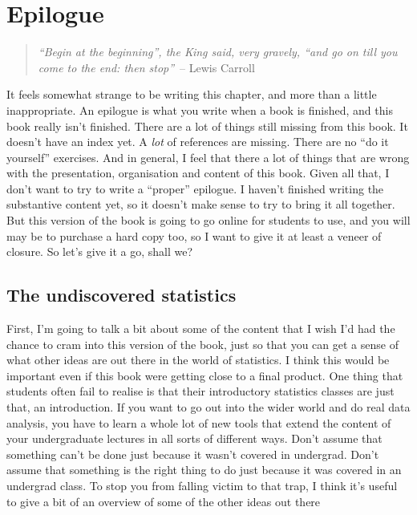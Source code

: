 \documentclass[
  a4paper,
]{book}
\begin{document}

\hypertarget{epilogue}{%
\chapter*{Epilogue}\label{epilogue}}


\begin{quote}
\emph{``Begin at the beginning'', the King said, very gravely, ``and go
on till you come to the end: then stop''}~-- Lewis Carroll
\end{quote}

It feels somewhat strange to be writing this chapter, and more than a
little inappropriate. An epilogue is what you write when a book is
finished, and this book really isn't finished. There are a lot of things
still missing from this book. It doesn't have an index yet. A \emph{lot}
of references are missing. There are no ``do it yourself'' exercises.
And in general, I feel that there a lot of things that are wrong with
the presentation, organisation and content of this book. Given all that,
I don't want to try to write a ``proper'' epilogue. I haven't finished
writing the substantive content yet, so it doesn't make sense to try to
bring it all together. But this version of the book is going to go
online for students to use, and you will may be to purchase a hard copy
too, so I want to give it at least a veneer of closure. So let's give it
a go, shall we?

\hypertarget{the-undiscovered-statistics}{%
\section*{The undiscovered
statistics}\label{the-undiscovered-statistics}}


First, I'm going to talk a bit about some of the content that I wish I'd
had the chance to cram into this version of the book, just so that you
can get a sense of what other ideas are out there in the world of
statistics. I think this would be important even if this book were
getting close to a final product. One thing that students often fail to
realise is that their introductory statistics classes are just that, an
introduction. If you want to go out into the wider world and do real
data analysis, you have to learn a whole lot of new tools that extend
the content of your undergraduate lectures in all sorts of different
ways. Don't assume that something can't be done just because it wasn't
covered in undergrad. Don't assume that something is the right thing to
do just because it was covered in an undergrad class. To stop you from
falling victim to that trap, I think it's useful to give a bit of an
overview of some of the other ideas out there
\end{document}
